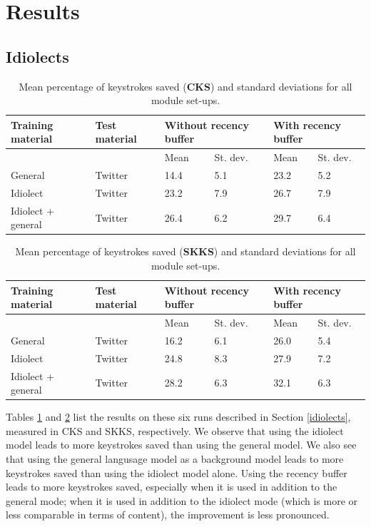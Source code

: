\documentclass[12pt]{article}
\begin{document}
\section{Results} \label{results}

\subsection{Idiolects}

\begin{table}[htb] 
\centering
\begin{tabular}{ll|llll} 
Training material&Test material&\multicolumn{2}{l}{Without recency buffer}&\multicolumn{2}{l}{With recency buffer}\\
\hline
&&Mean&St. dev.&Mean&St. dev.\\
General&Twitter&14.4&5.1&23.2&5.2\\
Idiolect&Twitter&23.2&7.9&26.7&7.9\\
Idiolect + general &Twitter&26.4&6.2&29.7&6.4\\
\end{tabular} 
\caption{Mean percentage of keystrokes saved (\textbf{CKS}) and standard deviations for all module set-ups.} \label{twitter_results_cks}
\end{table}

\begin{table}[htb] 
\centering
\begin{tabular}{ll|llll} 
Training material&Test material&\multicolumn{2}{l}{Without recency buffer}&\multicolumn{2}{l}{With recency buffer}\\
\hline
&&Mean&St. dev.&Mean&St. dev.\\
General&Twitter&16.2&6.1&26.0&5.4\\
Idiolect&Twitter&24.8&8.3&27.9&7.2\\
Idiolect + general&Twitter&28.2&6.3&32.1&6.3\\
\end{tabular} 
\caption{Mean percentage of keystrokes saved (\textbf{SKKS}) and standard deviations for all module set-ups.} \label{twitter_results_skks}
\end{table}

Tables \ref{twitter_results_cks} and \ref{twitter_results_skks} list the results on these six runs described in Section \ref{idiolects}, measured in CKS and SKKS, respectively. We observe that using the idiolect model leads to more keystrokes saved than using the general model. We also see that using the general langusage model as a background model leads to more keystrokes saved than using the idiolect model alone. Using the recency buffer leads to more keystrokes saved, especially when it is used in addition to the general mode; when it is used in addition to the idiolect mode (which is more or less comparable in terms of content), the improvement is less pronounced.
\end{document}
